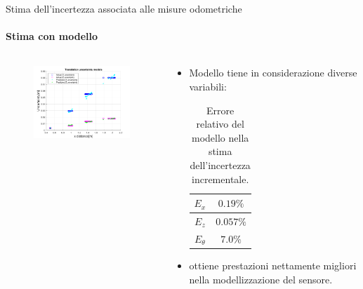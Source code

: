 \documentclass{beamer}
\begin{document}
\begin{frame}{Stima dell'incertezza associata alle misure odometriche}
\framesubtitle{Stima con modello}
\begin{columns}
    \begin{column}{0.6\textwidth}
    \begin{figure}
            \centering
            \includegraphics[width=8cm]{images/model.png}
            \label{fig:staticpos}
        \end{figure}
    \end{column}
    \begin{column}{0.4\textwidth}
    \begin{itemize}
        \item Modello tiene in considerazione diverse variabili:
        \begin{table}[]
            \centering
            \begin{tabular}{|c |c|}
            \hline
               $E_{x}$  & $0.19\%$ \\
               \hline
               $E_{z}$ & $0.057\%$\\
               \hline
               $E_{\theta}$ & $7.0\%$\\
               \hline
            \end{tabular}
            \caption{Errore relativo del modello nella stima dell'incertezza incrementale.}
        \end{table}
        \item ottiene prestazioni nettamente migliori nella modellizzazione del sensore.
    \end{itemize}
\end{column}
\end{columns}
\end{frame}
\end{document}
